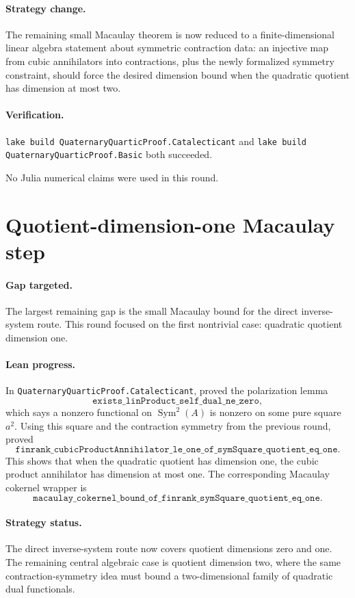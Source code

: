 \documentclass[11pt]{article}
\begin{document}
\paragraph{Strategy change.}
The remaining small Macaulay theorem is now reduced to a finite-dimensional
linear algebra statement about symmetric contraction data: an injective map
from cubic annihilators into contractions, plus the newly formalized symmetry
constraint, should force the desired dimension bound when the quadratic
quotient has dimension at most two.

\paragraph{Verification.}
\texttt{lake build QuaternaryQuarticProof.Catalecticant} and
\texttt{lake build QuaternaryQuarticProof.Basic} both succeeded.

No Julia numerical claims were used in this round.

\section*{Quotient-dimension-one Macaulay step}

\paragraph{Gap targeted.}
The largest remaining gap is the small Macaulay bound for the direct
inverse-system route.  This round focused on the first nontrivial case:
quadratic quotient dimension one.

\paragraph{Lean progress.}
In \texttt{QuaternaryQuarticProof.Catalecticant}, proved the polarization
lemma
\[
\texttt{exists\_linProduct\_self\_dual\_ne\_zero},
\]
which says a nonzero functional on \(\operatorname{Sym}^2(A)\) is nonzero on
some pure square \(a^2\).  Using this square and the contraction symmetry from
the previous round, proved
\[
\texttt{finrank\_cubicProductAnnihilator\_le\_one\_of\_symSquare\_quotient\_eq\_one}.
\]
This shows that when the quadratic quotient has dimension one, the cubic
product annihilator has dimension at most one.  The corresponding Macaulay
cokernel wrapper is
\[
\texttt{macaulay\_cokernel\_bound\_of\_finrank\_symSquare\_quotient\_eq\_one}.
\]

\paragraph{Strategy status.}
The direct inverse-system route now covers quotient dimensions zero and one.
The remaining central algebraic case is quotient dimension two, where the
same contraction-symmetry idea must bound a two-dimensional family of
quadratic dual functionals.
\end{document}
